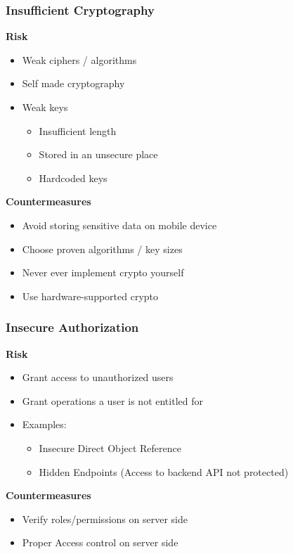 \subsubsection{Insufficient Cryptography}
\textbf{Risk}
\begin{itemize}
    \item Weak ciphers / algorithms
    \item Self made cryptography
    \item Weak keys
    \begin{itemize}
        \item Insufficient length
        \item Stored in an unsecure place
        \item Hardcoded keys
    \end{itemize}
\end{itemize}
\textbf{Countermeasures}
\begin{itemize}
    \item Avoid storing sensitive data on mobile device
    \item Choose proven algorithms / key sizes
    \item Never ever implement crypto yourself
    \item Use hardware-supported crypto
\end{itemize}

\subsubsection{Insecure Authorization}
\textbf{Risk}
\begin{itemize}
    \item Grant access to unauthorized users
    \item Grant operations a user is not entitled for
    \item Examples:
    \begin{itemize}
        \item Insecure Direct Object Reference
        \item Hidden Endpoints (Access to backend API not protected)
    \end{itemize}
\end{itemize}
\textbf{Countermeasures}
\begin{itemize}
    \item Verify roles/permissions on server side
    \item Proper Access control on server side
\end{itemize}

